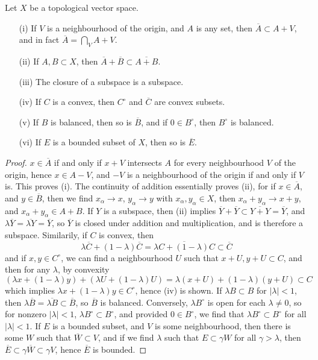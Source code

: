 \begin{theorem}
    Let $X$ be a topological vector space.
    \begin{enumerate}
        \item[(i)] If $V$ is a neighbourhood of the origin, and $A$ is any set, then $\overline{A} \subset A + V$, and in fact $\overline{A} = \bigcap_V A + V$.
        \item[(ii)] If $A,B \subset X$, then $\overline{A} + \overline{B} \subset \overline{A + B}$.
        \item[(iii)] The closure of a subspace is a subspace.
        \item[(iv)] If $C$ is a convex, then $C^\circ$ and $\overline{C}$ are convex subsets.
        \item[(v)] If $B$ is balanced, then so is $\overline{B}$, and if $0 \in B^\circ$, then $B^\circ$ is balanced.
        \item[(vi)] If $E$ is a bounded subset of $X$, then so is $\overline{E}$.
    \end{enumerate}
\end{theorem}
\begin{proof}
    $x \in \overline{A}$ if and only if $x + V$ intersects $A$ for every neighbourhood $V$ of the origin, hence $x \in A - V$, and $-V$ is a neighbourhood of the origin if and only if $V$ is. This proves (i). The continuity of addition essentially proves (ii), for if $x \in \overline{A}$, and $y \in \overline{B}$, then we find $x_\alpha \to x$, $y_\alpha \to y$ with $x_\alpha, y_\alpha \in X$, then $x_\alpha + y_\alpha \to x + y$, and $x_\alpha + y_\alpha \in A + B$. If $Y$ is a subspace, then (ii) implies $\overline{Y} + \overline{Y} \subset \overline{Y + Y} = \overline{Y}$, and $\lambda \overline{Y} = \overline{\lambda Y} = \overline{Y}$, so $\overline{Y}$ is closed under addition and multiplication, and is therefore a subspace. Similarily, if $C$ is convex, then
    \[ \lambda \overline{C} + (1 - \lambda) \overline{C} = \overline{\lambda C + (1 - \lambda) C} \subset \overline{C} \]
    and if $x,y \in C^\circ$, we can find a neighbourhood $U$ such that $x + U, y + U \subset C$, and then for any $\lambda$, by convexity
    \[ (\lambda x + (1 - \lambda) y) + (\lambda U + (1 - \lambda) U) = \lambda(x + U) + (1 - \lambda)(y + U) \subset C \]
    which implies $\lambda x + (1 - \lambda) y \in C^\circ$, hence (iv) is shown. If $\lambda B \subset B$ for $|\lambda| < 1$, then $\lambda \overline{B} = \overline{\lambda B} \subset \overline{B}$, so $\overline{B}$ is balanced. Conversely, $\lambda B^\circ$ is open for each $\lambda \neq 0$, so for nonzero $|\lambda| < 1$, $\lambda B^\circ \subset B^\circ$, and provided $0 \in B^\circ$, we find that $\lambda B^\circ \subset B^\circ$ for all $|\lambda| < 1$. If $E$ is a bounded subset, and $V$ is some neighbourhood, then there is some $W$ such that $\overline{W} \subset V$, and if we find $\lambda$ such that $E \subset \gamma W$ for all $\gamma > \lambda$, then $\overline{E} \subset \gamma \overline{W} \subset \gamma V$, hence $\overline{E}$ is bounded.
\end{proof}




